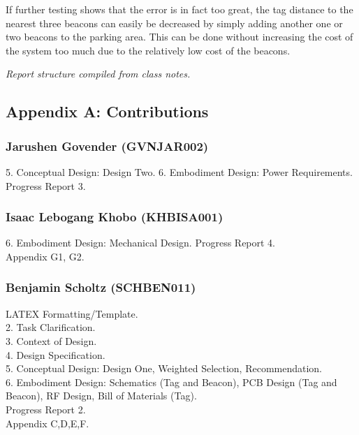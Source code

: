 If further testing shows that the error is in fact too great, the tag distance to the nearest three beacons
can easily be decreased by simply adding another one or two beacons to the parking area. This can be
done without increasing the cost of the system too much due to the relatively low cost of the beacons.

\textit{Report structure compiled from class notes.}\cite{handout}\cite{notes}



\newpage





\newpage
\vspace*{\fill}
\begin{center}
\subsection*{Appendix A: Contributions}
\end{center}
\vspace*{\fill}

\newpage
\subsubsection*{Jarushen Govender (GVNJAR002)}
5. Conceptual Design: Design Two.
6. Embodiment Design: Power Requirements.
Progress Report 3.
\subsubsection*{Isaac Lebogang Khobo (KHBISA001)}
6. Embodiment Design: Mechanical Design.
Progress Report 4. \\
Appendix G1, G2.
\subsubsection*{Benjamin Scholtz (SCHBEN011)}
LATEX Formatting/Template. \\
2. Task Clarification. \\
3. Context of Design. \\
4. Design Specification. \\
5. Conceptual Design: Design One, Weighted Selection, Recommendation. \\
6. Embodiment Design: Schematics (Tag and Beacon), PCB Design (Tag and Beacon), RF Design, Bill of Materials (Tag). \\
Progress Report 2. \\
Appendix C,D,E,F.
